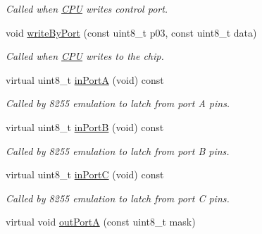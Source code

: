 \begin{DoxyCompactItemize}
\begin{DoxyCompactList}\small\item\em Called when \hyperlink{classCPU}{C\-P\-U} writes control port. \end{DoxyCompactList}\item 
\hypertarget{classIntel8255_afc2d37b28f019c4ba64495a19d37eb1a}{void \hyperlink{classIntel8255_afc2d37b28f019c4ba64495a19d37eb1a}{write\-By\-Port} (const uint8\-\_\-t p03, const uint8\-\_\-t data)}\label{classIntel8255_afc2d37b28f019c4ba64495a19d37eb1a}

\begin{DoxyCompactList}\small\item\em Called when \hyperlink{classCPU}{C\-P\-U} writes to the chip. \end{DoxyCompactList}\item 
\hypertarget{classIntel8255_a387e1edf0b09feea29362f1854398237}{virtual uint8\-\_\-t \hyperlink{classIntel8255_a387e1edf0b09feea29362f1854398237}{in\-Port\-A} (void) const }\label{classIntel8255_a387e1edf0b09feea29362f1854398237}

\begin{DoxyCompactList}\small\item\em Called by 8255 emulation to latch from port A pins. \end{DoxyCompactList}\item 
\hypertarget{classIntel8255_a5e4a8c34778bef66b5d2ddcf7b372be1}{virtual uint8\-\_\-t \hyperlink{classIntel8255_a5e4a8c34778bef66b5d2ddcf7b372be1}{in\-Port\-B} (void) const }\label{classIntel8255_a5e4a8c34778bef66b5d2ddcf7b372be1}

\begin{DoxyCompactList}\small\item\em Called by 8255 emulation to latch from port B pins. \end{DoxyCompactList}\item 
\hypertarget{classIntel8255_ac02d52c1bf5c0fb0478dfb0ffb1b8ec8}{virtual uint8\-\_\-t \hyperlink{classIntel8255_ac02d52c1bf5c0fb0478dfb0ffb1b8ec8}{in\-Port\-C} (void) const }\label{classIntel8255_ac02d52c1bf5c0fb0478dfb0ffb1b8ec8}

\begin{DoxyCompactList}\small\item\em Called by 8255 emulation to latch from port C pins. \end{DoxyCompactList}\item 
\hypertarget{classIntel8255_a15b8c1a78f8f1ca7ac90b92cc329f7d0}{virtual void \hyperlink{classIntel8255_a15b8c1a78f8f1ca7ac90b92cc329f7d0}{out\-Port\-A} (const uint8\-\_\-t mask)}\label{classIntel8255_a15b8c1a78f8f1ca7ac90b92cc329f7d0}


\end{DoxyCompactItemize}
